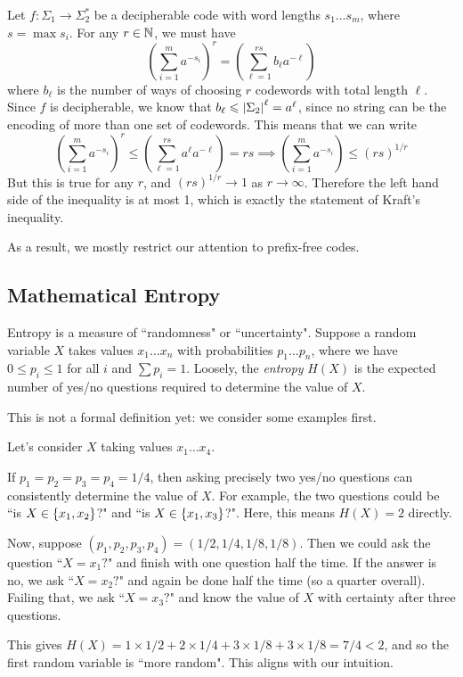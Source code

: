 \documentclass{article}
\begin{document}
\begin{prf}
	Let $f: \Sigma_1 \to \Sigma_2^*$
	be a decipherable code with word lengths $s_1 \dots s_m$,
	where $s = \max s_i$.
	For any $r \in \mathbb{N}$, we must have
	\[
	\left( \sum_{i=1}^m a^{-s_i} \right)^r =
	\left( \sum_{\ell=1}^{rs} b_\ell a^{-\ell} \right)
	\]
	where $b_\ell$ is the number of ways
	of choosing $r$ codewords with total length $\ell$.
	Since $f$ is decipherable,
	we know that $b_\ell \leqslant \left\lvert \Sigma_2 \right\rvert^\ell = a^\ell$,
	since no string can be the encoding of more than one set of codewords.
	This means that we can write
	\[
	\left( \sum_{i=1}^m a^{-s_i} \right)^r \leq
	\left( \sum_{\ell=1}^{rs} a^\ell a^{-\ell} \right) =
	rs
	\implies
	\left( \sum_{i=1}^m a^{-s_i} \right) \leq
	(rs)^{1/r}
	\]
	But this is true for any $r$,
	and $(rs)^{1/r} \to 1$ as $r \to \infty$.
	Therefore the left hand side of the inequality is at most 1,
	which is exactly the statement of Kraft's inequality.
\end{prf}

As a result, we mostly restrict our attention to prefix-free codes.


\subsection{Mathematical Entropy}

Entropy is a measure of ``randomness" or ``uncertainty".
Suppose a random variable $X$
takes values $x_1 \dots x_n$
with probabilities $p_1 \dots p_n$,
where we have $0 \leq p_i \leq 1$ for all $i$
and $\sum p_i = 1$.
Loosely, the \textit{entropy} $H(X)$ is
the expected number of yes/no questions required to determine the value of $X$.

This is not a formal definition yet: we consider some examples first.

\begin{example}
	Let's consider $X$ taking values $x_1 \dots x_4$.
    
    If $p_1 = p_2 = p_3 = p_4 = 1/4$,
    then asking precisely two yes/no questions
    can consistently determine the value of $X$.
    For example, the two questions could be
    ``is $X \in \left\lbrace x_1, x_2 \right\rbrace$?"
    and
    ``is $X \in \left\lbrace x_1, x_3 \right\rbrace$?".
    Here, this means $H(X) = 2$ directly.
    
    Now, suppose
    $(p_1, p_2, p_3, p_4) = (1/2, 1/4, 1/8, 1/8)$.
    Then we could ask the question ``$X = x_1?$"
    and finish with one question half the time.
    If the answer is no, we ask ``$X = x_2?$"
    and again be done half the time (so a quarter overall).
    Failing that, we ask ``$X = x_3?$"
    and know the value of $X$ with certainty after three questions.
    
    This gives
    $H(X) = 1 \times 1/2 + 2 \times 1/4 + 3 \times 1/8 +  3 \times 1/8 = 7/4 < 2$,
    and so the first random variable is ``more random".
    This aligns with our intuition.
\end{example}
\end{document}
